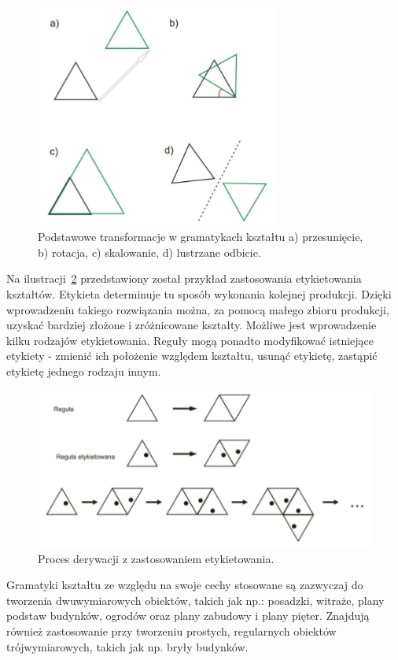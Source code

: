 \begin{figure}[h!]
  \centering
  \includegraphics[width=8cm]{images/shapes02.png}
  \caption{Podstawowe transformacje w gramatykach kształtu a) przesunięcie, b)
  rotacja, c) skalowanie, d) lustrzane odbicie.\cite{gaudi}}
  \label{shapes02}
\end{figure}


Na ilustracji~\ref{etykietowanie} przedstawiony został przykład zastosowania
etykietowania kształtów. Etykieta determinuje tu sposób wykonania kolejnej produkcji. Dzięki
wprowadzeniu takiego rozwiązania można, za pomocą małego zbioru produkcji,
uzyskać bardziej złożone i zróżnicowane kształty. Możliwe jest wprowadzenie
kilku rodzajów etykietowania. Reguły mogą ponadto modyfikować istniejące
etykiety - zmienić ich położenie względem kształtu, usunąć etykietę, zastąpić
etykietę jednego rodzaju innym.

\begin{figure}[h!]
  \centering
  \includegraphics[width=12cm]{images/etykietowanie.png}
  \caption{Proces derywacji z zastosowaniem etykietowania.\cite{gaudi}}
  \label{etykietowanie}
\end{figure}

Gramatyki kształtu ze względu na swoje cechy stosowane są zazwyczaj do tworzenia
dwuwymiarowych obiektów, takich jak np.: posadzki, witraże, plany podstaw
budynków, ogrodów oraz plany zabudowy i plany pięter. Znajdują również
zastosowanie przy tworzeniu prostych, regularnych obiektów trójwymiarowych,
takich jak np. bryły budynków.

